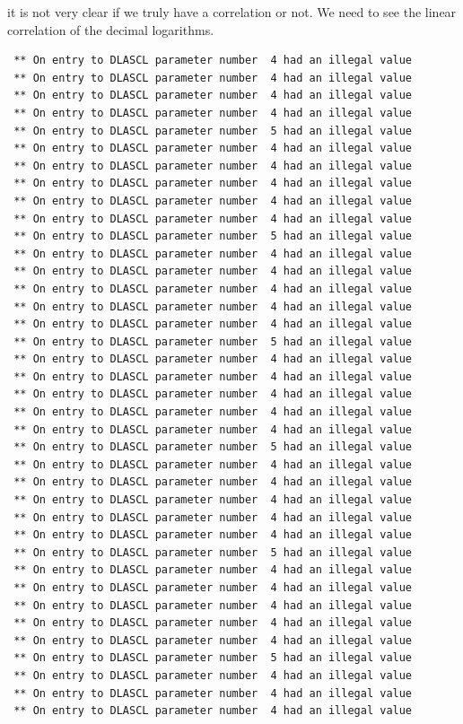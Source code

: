 \documentclass[
]{article}
\begin{document}
it is not very clear if we truly have a correlation or not. We need to
see the linear correlation of the decimal logarithms.

\begin{verbatim}
 ** On entry to DLASCL parameter number  4 had an illegal value
 ** On entry to DLASCL parameter number  4 had an illegal value
 ** On entry to DLASCL parameter number  4 had an illegal value
 ** On entry to DLASCL parameter number  4 had an illegal value
 ** On entry to DLASCL parameter number  5 had an illegal value
 ** On entry to DLASCL parameter number  4 had an illegal value
 ** On entry to DLASCL parameter number  4 had an illegal value
 ** On entry to DLASCL parameter number  4 had an illegal value
 ** On entry to DLASCL parameter number  4 had an illegal value
 ** On entry to DLASCL parameter number  4 had an illegal value
 ** On entry to DLASCL parameter number  5 had an illegal value
 ** On entry to DLASCL parameter number  4 had an illegal value
 ** On entry to DLASCL parameter number  4 had an illegal value
 ** On entry to DLASCL parameter number  4 had an illegal value
 ** On entry to DLASCL parameter number  4 had an illegal value
 ** On entry to DLASCL parameter number  4 had an illegal value
 ** On entry to DLASCL parameter number  5 had an illegal value
 ** On entry to DLASCL parameter number  4 had an illegal value
 ** On entry to DLASCL parameter number  4 had an illegal value
 ** On entry to DLASCL parameter number  4 had an illegal value
 ** On entry to DLASCL parameter number  4 had an illegal value
 ** On entry to DLASCL parameter number  4 had an illegal value
 ** On entry to DLASCL parameter number  5 had an illegal value
 ** On entry to DLASCL parameter number  4 had an illegal value
 ** On entry to DLASCL parameter number  4 had an illegal value
 ** On entry to DLASCL parameter number  4 had an illegal value
 ** On entry to DLASCL parameter number  4 had an illegal value
 ** On entry to DLASCL parameter number  4 had an illegal value
 ** On entry to DLASCL parameter number  5 had an illegal value
 ** On entry to DLASCL parameter number  4 had an illegal value
 ** On entry to DLASCL parameter number  4 had an illegal value
 ** On entry to DLASCL parameter number  4 had an illegal value
 ** On entry to DLASCL parameter number  4 had an illegal value
 ** On entry to DLASCL parameter number  4 had an illegal value
 ** On entry to DLASCL parameter number  5 had an illegal value
 ** On entry to DLASCL parameter number  4 had an illegal value
 ** On entry to DLASCL parameter number  4 had an illegal value
 ** On entry to DLASCL parameter number  4 had an illegal value

\end{verbatim}
\end{document}
